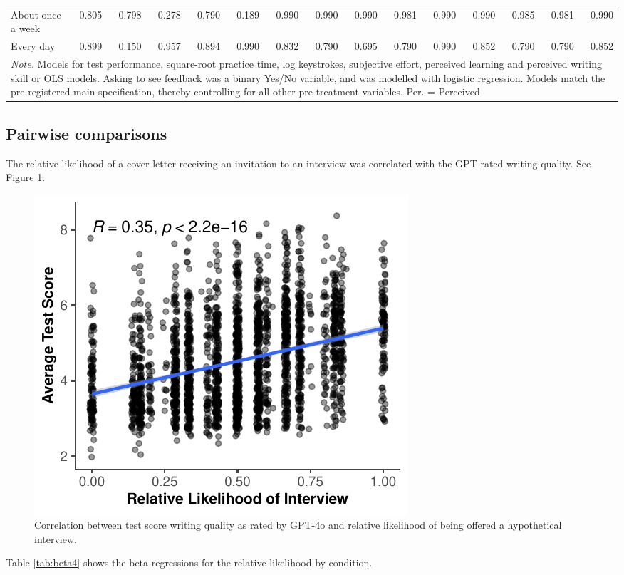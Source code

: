 \documentclass[11pt]{report}
\begin{document}
\begin{append}
\begin{landscape}
\begin{table}[]
\begin{tabular}{lrrrrrrrrrrrrrr}
About once a week & 0.805 & 0.798 & 0.278 & 0.790 & 0.189 & 0.990 & 0.990 & 0.990 & 0.981 & 0.990 & 0.990 & 0.985 & 0.981 & 0.990 \\ 
Every day & 0.899 & 0.150 & 0.957 & 0.894 & 0.990 & 0.832 & 0.790 & 0.695 & 0.790 & 0.990 & 0.852 & 0.790 & 0.790 & 0.852 \\ 
\midrule
\multicolumn{15}{p{17cm}}{\textit{Note.} Models for test performance, square-root practice time, log keystrokes, subjective effort, perceived learning and perceived writing skill or OLS models. Asking to see feedback was a binary Yes/No variable, and was modelled with logistic regression. Models match the pre-registered main specification, thereby controlling for all other pre-treatment variables. Per. = Perceived}
\vspace{5pt}
\end{tabular}
    \label{tab:interactions5}
\end{table}
\end{landscape}

\subsection{Pairwise comparisons}
The relative likelihood of a cover letter receiving an invitation to an interview was correlated with the GPT-rated writing quality. See Figure \ref{fig:correlations4}.

\begin{figure}
    \centering
    \includegraphics[width=0.5\linewidth]{correlations4.pdf}
    \caption{Correlation between test score writing quality as rated by GPT-4o and relative likelihood of being offered a hypothetical interview.}
    \label{fig:correlations4}
\end{figure}

Table \ref{tab:beta4} shows the beta regressions for the relative likelihood by condition.



\end{append}
\end{document}
